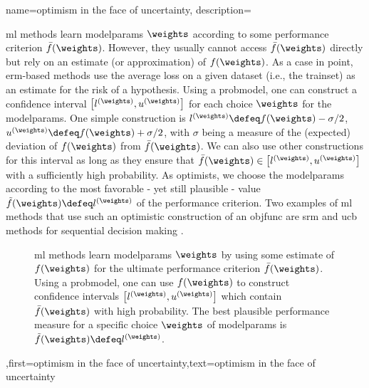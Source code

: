 {{
{name={optimism in the face of uncertainty},
	description={\gls{ml} methods learn \gls{modelparams} $\weights$ 
		according to some performance criterion $\bar{f}(\weights)$. However, they usually 
		cannot access $\bar{f}(\weights)$ directly but rely on an estimate (or approximation) of $f(\weights)$. 
		As a case in point, \gls{erm}-based methods use the average \gls{loss} on a given \gls{dataset} (i.e., the \gls{trainset}) 
		as an estimate for the \gls{risk} of a \gls{hypothesis}. Using a \gls{probmodel}, one can construct 
		a confidence interval 
	$\big[ l^{(\weights)},  u^{(\weights)} \big]$ for each choice $\weights$ for the \gls{modelparams}.
	One simple construction is $l^{(\weights)} \defeq f(\weights) - \sigma/2$, $u^{(\weights)} \defeq f(\weights)+ \sigma/2$, 
	with $\sigma$ being a measure of the (expected) deviation of $f(\weights)$ from $\bar{f}(\weights)$. 
	We can also use other constructions for this interval as long as they ensure that $\bar{f}(\weights) \in\big[ l^{(\weights)},  u^{(\weights)} \big]$ 
	with a sufficiently high probability. As optimists, we choose the \gls{modelparams} 
	according to the most favorable - yet still plausible - value $\tilde{f}(\weights) \defeq  l^{(\weights)}$ of the performance criterion. 
	Two examples of \gls{ml} methods that use such an optimistic construction of an \gls{objfunc} 
	are \gls{srm} \cite[Ch. 11]{ShalevMLBook} and \gls{ucb} methods for sequential decision making \cite[Sec. 2.2]{Bubeck2012}. 
		\begin{figure}[H]
				\begin{center}
\caption{\gls{ml} methods learn \gls{modelparams} $\weights$ by using some estimate of $f(\weights)$ for 
	the ultimate performance criterion $\bar{f}(\weights)$. Using a \gls{probmodel}, one can use $f(\weights)$ to 
	construct confidence intervals $\big[ l^{(\weights)},  u^{(\weights)} \big]$ which contain $\bar{f}(\weights)$  
	with high probability. The best plausible performance measure for a specific choice $\weights$ of \gls{modelparams} 
	is $\tilde{f}(\weights) \defeq l^{(\weights)}$.} 
	\end{center}
		\end{figure}},first={optimism in the face of uncertainty},text={optimism in the face of uncertainty} 
}

}}
